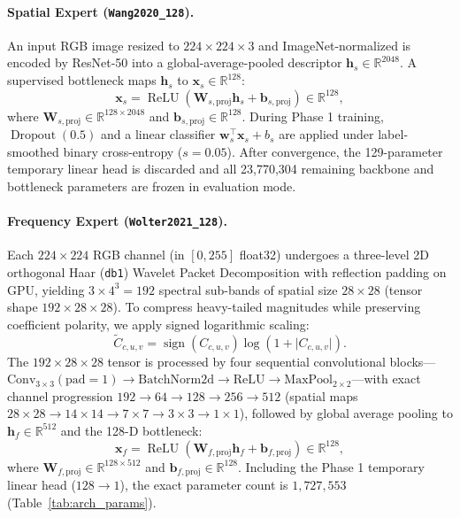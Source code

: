 \documentclass[fleqn,10pt]{wlscirep}
\begin{document}
\paragraph{Spatial Expert (\texttt{Wang2020\_128}).}
An input RGB image resized to $224 \times 224 \times 3$ and ImageNet-normalized is encoded by ResNet-50 into a global-average-pooled descriptor $\mathbf{h}_s \in \mathbb{R}^{2048}$. A supervised bottleneck maps $\mathbf{h}_s$ to $\mathbf{x}_s \in \mathbb{R}^{128}$:
\begin{equation}
\mathbf{x}_s = \operatorname{ReLU}\!\left(\mathbf{W}_{s,\text{proj}}\mathbf{h}_s + \mathbf{b}_{s,\text{proj}}\right) \in \mathbb{R}^{128},
\label{eq:spatial_embed}
\end{equation}
where $\mathbf{W}_{s,\text{proj}} \in \mathbb{R}^{128 \times 2048}$ and $\mathbf{b}_{s,\text{proj}} \in \mathbb{R}^{128}$. During Phase 1 training, $\operatorname{Dropout}(0.5)$ and a linear classifier $\mathbf{w}_s^\top \mathbf{x}_s + b_s$ are applied under label-smoothed binary cross-entropy ($s=0.05$). After convergence, the 129-parameter temporary linear head is discarded and all 23,770,304 remaining backbone and bottleneck parameters are frozen in evaluation mode.

\paragraph{Frequency Expert (\texttt{Wolter2021\_128}).}
Each $224 \times 224$ RGB channel (in $[0,255]$ float32) undergoes a three-level 2D orthogonal Haar (\texttt{db1}) Wavelet Packet Decomposition with reflection padding on GPU, yielding $3 \times 4^3 = 192$ spectral sub-bands of spatial size $28 \times 28$ (tensor shape $192 \times 28 \times 28$). To compress heavy-tailed magnitudes while preserving coefficient polarity, we apply signed logarithmic scaling:
\begin{equation}
\tilde{C}_{c,u,v} = \operatorname{sign}\!\left(C_{c,u,v}\right)\log\!\left(1 + \lvert C_{c,u,v} \rvert\right).
\label{eq:wavelet_log}
\end{equation}
The $192 \times 28 \times 28$ tensor is processed by four sequential convolutional blocks---$\text{Conv}_{3\times 3}(\text{pad}=1) \to \text{BatchNorm2d} \to \text{ReLU} \to \text{MaxPool}_{2\times 2}$---with exact channel progression $192 \to 64 \to 128 \to 256 \to 512$ (spatial maps $28\times 28 \to 14\times 14 \to 7\times 7 \to 3\times 3 \to 1\times 1$), followed by global average pooling to $\mathbf{h}_f \in \mathbb{R}^{512}$ and the 128-D bottleneck:
\begin{equation}
\mathbf{x}_f = \operatorname{ReLU}\!\left(\mathbf{W}_{f,\text{proj}}\mathbf{h}_f + \mathbf{b}_{f,\text{proj}}\right) \in \mathbb{R}^{128},
\label{eq:freq_embed}
\end{equation}
where $\mathbf{W}_{f,\text{proj}} \in \mathbb{R}^{128 \times 512}$ and $\mathbf{b}_{f,\text{proj}} \in \mathbb{R}^{128}$. Including the Phase 1 temporary linear head ($128 \to 1$), the exact parameter count is $1,727,553$ (Table~\ref{tab:arch_params}).
\end{document}
